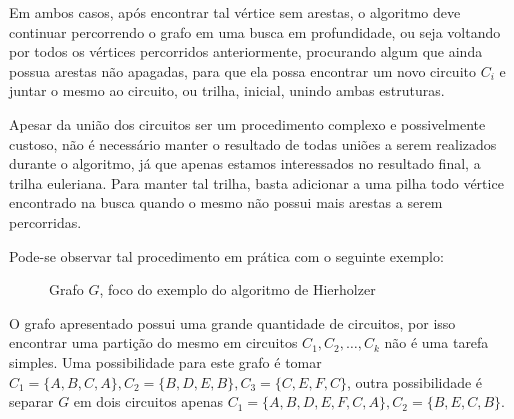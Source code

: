 Em ambos casos, após encontrar tal vértice sem arestas, o algoritmo deve continuar percorrendo o grafo em uma busca em profundidade, ou seja voltando por todos os vértices percorridos anteriormente, procurando algum que ainda possua arestas não apagadas, para que ela possa encontrar um novo circuito $C_i$ e juntar o mesmo ao circuito, ou trilha, inicial, unindo ambas estruturas. 

Apesar da união dos circuitos ser um procedimento complexo e possivelmente custoso, não é necessário manter o resultado de todas uniões a serem realizados durante o algoritmo, já que apenas estamos interessados no resultado final, a trilha euleriana.
Para manter tal trilha, basta adicionar a uma pilha todo vértice encontrado na busca quando o mesmo não possui mais arestas a serem percorridas.

Pode-se observar tal procedimento em prática com o seguinte exemplo:

\begin{figure}[H]
    \center
    \caption{Grafo $G$, foco do exemplo do algoritmo de Hierholzer}
\end{figure}

\sloppy O grafo apresentado possui uma grande quantidade de circuitos, por isso encontrar uma partição do mesmo em circuitos $C_1, C_2, \dots, C_k$ não é uma tarefa simples.
Uma possibilidade para este grafo é tomar $C_1 = \{A, B, C, A\}, C_2 = \{B, D, E, B\}, C_3 = \{C, E, F, C\}$, outra possibilidade é separar $G$ em dois circuitos apenas $C_1 = \{A, B, D, E, F, C, A\}, C_2 = \{B, E, C, B\}$.

